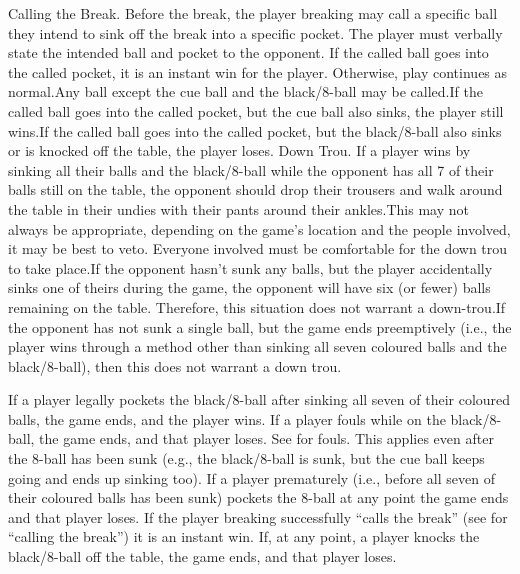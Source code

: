 Calling the Break. Before the break, the player breaking may call a specific ball they intend to sink off the break into a specific pocket. The player must verbally state the intended ball and pocket to the opponent. If the called ball goes into the called pocket, it is an instant win for the player. Otherwise, play continues as normal.\standardspace Any ball except the cue ball and the black/8-ball may be called.\standardspace If the called ball goes into the called pocket, but the cue ball also sinks, the player still wins.\standardspace If the called ball goes into the called pocket, but the black/8-ball also sinks or is knocked off the table, the player loses.%
 Down Trou. If a player wins by sinking all their balls and the black/8-ball while the opponent has all 7 of their balls still on the table, the opponent should drop their trousers and walk around the table in their undies with their pants around their ankles.\standardspace This may not always be appropriate, depending on the game's location and the people involved, it may be best to veto. Everyone involved must be comfortable for the down trou to take place.\standardspace If the opponent hasn’t sunk any balls, but the player accidentally sinks one of theirs during the game, the opponent will have six (or fewer) balls remaining on the table. Therefore, this situation does not warrant a down-trou.\standardspace If the opponent has not sunk a single ball, but the game ends preemptively (i.e., the player wins through a method other than sinking all seven coloured balls and the black/8-ball), then this does not warrant a down trou.%


 If a player legally pockets the black/8-ball after sinking all seven of their coloured balls, the game ends, and the player wins.%
 If a player fouls while on the black/8-ball, the game ends, and that player loses. See  for fouls. This applies even after the 8-ball has been sunk (e.g., the black/8-ball is sunk, but the cue ball keeps going and ends up sinking too).%
 If a player prematurely (i.e., before all seven of their coloured balls has been sunk) pockets the 8-ball at any point the game ends and that player loses.%
 If the player breaking successfully “calls the break” (see  for “calling the break”) it is an instant win.%
 If, at any point, a player knocks the black/8-ball off the table, the game ends, and that player loses.%
 {}%
 {}%
 {}%

